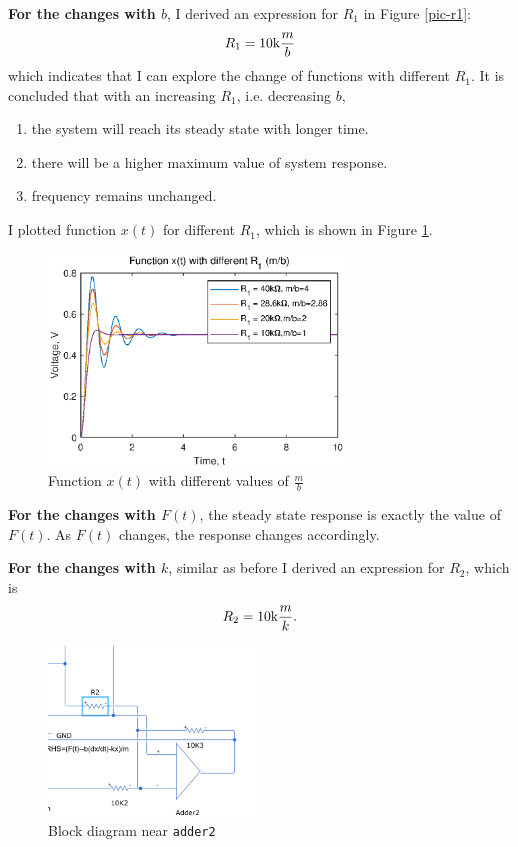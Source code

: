 \textbf{For the changes with $b$}, I derived an expression for $R_1$ in Figure
\ref{pic-r1}:
\[R_1=10\text{k} \frac{m}{b}\]
which indicates that I can explore the change of functions with different
$R_1$. It is concluded that with an increasing $R_1$, i.e. decreasing $b$,
\begin{enumerate}
  \item the system will reach its steady state with longer time.
  \item there will be a higher maximum value of system response.
  \item frequency remains unchanged.
\end{enumerate}

I plotted function $x(t)$ for different $R_1$, which is shown in
Figure \ref{pic-m-b}.

\begin{figure}[htbp]
  \centering
  \includegraphics[width=0.7\textwidth]{pics/change-m-b.eps}
  \caption{Function $x(t)$ with different values of $\frac{m}{b}$}
  \label{pic-m-b}
\end{figure}

\textbf{For the changes with $F(t)$}, the steady state response is exactly the
value of $F(t)$. As $F(t)$ changes, the response changes accordingly.

\textbf{For the changes with $k$}, similar as before I derived an expression
for $R_2$, which is 
\[R_2=10\text{k} \frac{m}{k}.\]

\begin{figure}[htbp]
  \centering
  \includegraphics[width=0.5\textwidth]{pics/adder2-r2.png}
  \caption{Block diagram near \texttt{adder2}}
\end{figure}

